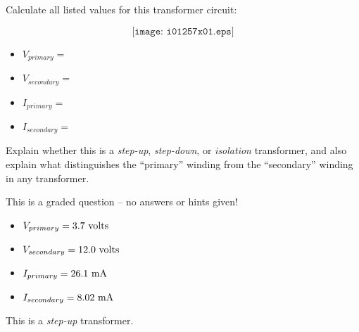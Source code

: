 

Calculate all listed values for this transformer circuit:

$$\texttt{[image: i01257x01.eps]}$$

\begin{itemize}
\item{} $V_{primary} = $
\item{} $V_{secondary} = $
\item{} $I_{primary} = $
\item{} $I_{secondary} = $
\end{itemize}

Explain whether this is a {\it step-up}, {\it step-down}, or {\it isolation} transformer, and also explain what distinguishes the ``primary'' winding from the ``secondary'' winding in any transformer.

\vfil 

\eject






This is a graded question -- no answers or hints given!







\begin{itemize}
\item{} $V_{primary} = 3.7 \hbox{ volts}$
\item{} $V_{secondary} = 12.0 \hbox{ volts}$
\item{} $I_{primary} = 26.1 \hbox{ mA}$
\item{} $I_{secondary} = 8.02 \hbox{ mA}$
\end{itemize}

This is a {\it step-up} transformer.




